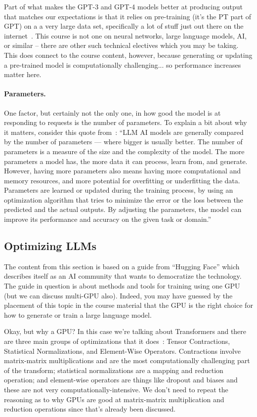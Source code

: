 \documentclass[a4paper]{report}
\begin{document}
Part of what makes the GPT-3 and GPT-4 models better at producing output that matches our expectations is that it relies on pre-training (it's the PT part of GPT) on a a very large data set, specifically a lot of stuff just out there on the internet~\cite{gptforgood}. This course is not one on neural networks, large language models, AI, or similar -- there are other such technical electives which you may be taking. This does connect to the course content, however, because generating or updating a pre-trained model is computationally challenging... so performance increases matter here.

\paragraph{Parameters.} One factor, but certainly not the only one, in how good the model is at responding to requests is the number of parameters. To explain a bit about why it matters, consider this quote from~\cite{msllm}: ``LLM AI models are generally compared by the number of parameters — where bigger is usually better. The number of parameters is a measure of the size and the complexity of the model. The more parameters a model has, the more data it can process, learn from, and generate. However, having more parameters also means having more computational and memory resources, and more potential for overfitting or underfitting the data. Parameters are learned or updated during the training process, by using an optimization algorithm that tries to minimize the error or the loss between the predicted and the actual outputs. By adjusting the parameters, the model can improve its performance and accuracy on the given task or domain.''

\subsection*{Optimizing LLMs}
The content from this section is based on a guide from ``Hugging Face'' which describes itself as an AI community that wants to democratize the technology. The guide in question is about methods and tools for training using one GPU~\cite{hf} (but we can discuss multi-GPU also). Indeed, you may have guessed by the placement of this topic in the course material that the GPU is the right choice for how to generate or train a large language model. 

Okay, but why a GPU? In this case we're talking about Transformers and there are three main groups of optimizations that it does~\cite{hf2}: Tensor Contractions, Statistical Normalizations, and Element-Wise Operators. Contractions involve matrix-matrix multiplications and are the most computationally challenging part of the transform; statistical normalizations are a mapping and reduction operation; and element-wise operators are things like dropout and biases and these are not very computationally-intensive. We don't need to repeat the reasoning as to why GPUs are good at matrix-matrix multiplication and reduction operations since that's already been discussed. 
\end{document}
